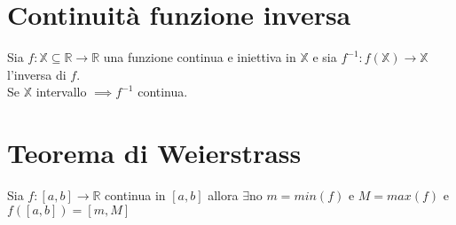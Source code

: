 \section{Continuità funzione inversa}
Sia $f: \mathbb{X} \subseteq \mathbb{R} \to \mathbb{R}$ una funzione continua e iniettiva in $\mathbb{X}$ e sia $f^{-1}:f(\mathbb{X}) \to \mathbb{X}$ l'inversa di $f$.\\
Se $\mathbb{X}$ intervallo $\implies f^{-1}$ continua.

\section{Teorema di Weierstrass}
Sia $f:[a,b] \to \mathbb{R}$ continua in $[a,b]$ allora $\exists$no $m = min(f)$ e $M = max(f)$ e $f([a,b]) = [m,M]$